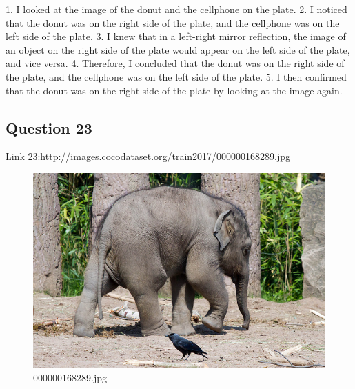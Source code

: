 \begin{enumerate}
        1. I looked at the image of the donut and the cellphone on the plate.
        2. I noticed that the donut was on the right side of the plate, and the cellphone was on the left side of the plate.
        3. I knew that in a left-right mirror reflection, the image of an object on the right side of the plate would appear on the left side of the plate, and vice versa.
        4. Therefore, I concluded that the donut was on the right side of the plate, and the cellphone was on the left side of the plate.
        5. I then confirmed that the donut was on the right side of the plate by looking at the image again.
    \end{enumerate}
\subsection*{Question 23}
Link 23:http://images.cocodataset.org/train2017/000000168289.jpg
    \begin{figure}[h]
        \centering
        \includegraphics[width=0.8\linewidth]{../image set/easy/000000168289.jpg}
        \caption{000000168289.jpg}
    \end{figure}
